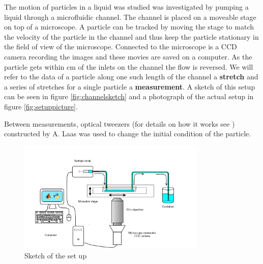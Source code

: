 The motion of particles in a liquid was studied was investigated by pumping a liquid through a microfluidic channel. The channel is placed on a moveable stage on top of a microscope. A particle can be tracked by moving the stage to match the velocity of the particle in the channel and thus keep the particle stationary in the field of view of the microscope. Connected to the microscope is a CCD camera recording the images and these movies are saved on a computer. As the particle gets within \unit[1]{cm} of the inlets on the channel the flow is reversed. We will refer to the data of a particle along one such length of the channel a \textbf{stretch} and a series of stretches for a single particle a \textbf{measurement}. A sketch of this setup can be seen in figure \ref{fig:channelsketch} and a photograph of the actual setup in figure \ref{fig:setuppicture}.

Between measurements, optical tweezers (for details on how it works see \cite{OpticalTweezer}) constructed by A. Laas  \cite{alexanderThesis} was used to change the initial condition of the particle. 


\begin{figure}[H]
\centering
\includegraphics[width=0.8\textwidth]{figures/method/setupsketch.png}
\caption{Sketch of the set up}\label{fig:setupsketch}
\end{figure}

